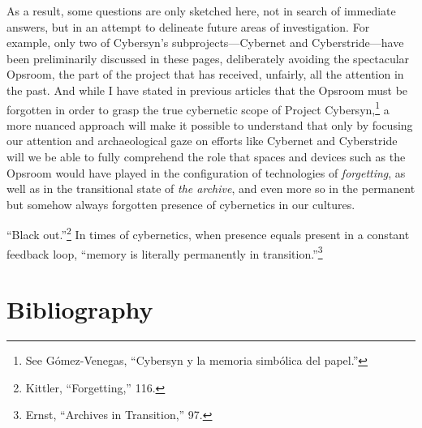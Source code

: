 \documentclass{tufte-handout}
\begin{document}
As a result, some questions are only sketched here, not in search of
immediate answers, but in an attempt to delineate future areas of
investigation. For example, only two of Cybersyn's
subprojects---Cybernet and Cyberstride---have been preliminarily
discussed in these pages, deliberately avoiding the spectacular Opsroom,
the part of the project that has received, unfairly, all the attention
in the past. And while I have stated in previous articles that the
Opsroom must be forgotten in order to grasp the true cybernetic scope of
Project Cybersyn,\footnote{See Gómez-Venegas, ``Cybersyn y la memoria
  simbólica del papel.''} a more nuanced approach will make it possible
to understand that only by focusing our attention and archaeological
gaze on efforts like Cybernet and Cyberstride will we be able to fully
comprehend the role that spaces and devices such as the Opsroom would
have played in the configuration of technologies of \emph{forgetting},
as well as in the transitional state of \emph{the archive}, and even
more so in the permanent but somehow always forgotten presence of
cybernetics in our cultures.

``Black out.''\footnote{Kittler, ``Forgetting,'' 116.} In times of
cybernetics, when presence equals present in a constant feedback loop,
``memory is literally permanently in transition.''\footnote{Ernst,
  ``Archives in Transition,'' 97.}




\section{Bibliography}\label{bibliography}
\end{document}
